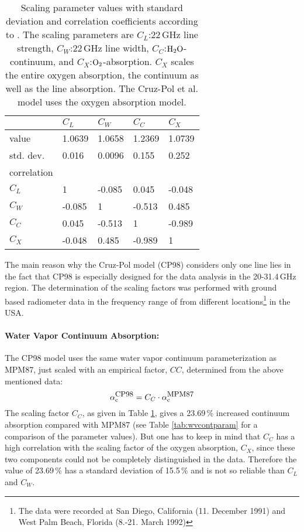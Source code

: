 \begin{table}[!htb]
\begin{center}
\begin{tabular}{lllll}
\hline
            & $C_L$ & $C_W$ & $C_C$ & $C_X$ \\
\hline
value       & 1.0639 & 1.0658 & 1.2369 & 1.0739\\
std. dev.   & 0.016  & 0.0096 & 0.155  & 0.252\\
\hline
correlation & &&&\\
$C_L$       & 1      & -0.085 & 0.045  & -0.048\\
$C_W$       & -0.085 & 1      & -0.513 &  0.485\\
$C_C$       & 0.045  & -0.513 & 1      & -0.989\\
$C_X$       & -0.048 & 0.485  & -0.989 & 1\\
\hline
\end{tabular}
\end{center}
\caption[CP98 scaling parameter values.]{Scaling parameter values with standard deviation and 
  correlation coefficients according to \citep{cruzpol:98}.
  The scaling parameters are $C_L$:22\,GHz line strength, 
  $C_W$:22\,GHz line width, $C_C$:$\mbox{H}_2\mbox{O}$-continuum, and 
  $C_X$:$\mbox{O}_2$-absorption. $C_X$ scales the entire oxygen absorption, 
  the continuum as well as the line absorption. The Cruz-Pol et al.
  model uses the \citet{pwr:93} oxygen absorption model.}
\label{tab:cp_orr}
\end{table}

The main reason why the Cruz-Pol model (CP98) considers only one line
lies in the fact that CP98 is especially designed for the data analysis
in the 20-31.4\,GHz region. The determination of the scaling factors was 
performed with ground based radiometer data in the frequency range of
from different locations\footnote{The data were recorded at San Diego, 
California (11. December 1991) and West Palm Beach, Florida 
(8.-21. March 1992)} in the USA.


\paragraph{Water Vapor Continuum Absorption:}
\label{levele:cp98_h2ocont}
The CP98 model uses the same water vapor continuum 
parameterization as MPM87, just scaled with an empirical 
factor, $CC$, determined from the above mentioned data:
\begin{equation}
 \label{eq:cp98_cont_scaling}
 \alpha^{\mbox{\rm \small CP98}}_{\rm c} = C_C \cdot \alpha^{\mbox{\rm \small MPM87}}_{\rm c} 
\end{equation}
The scaling factor $C_C$, as given in Table \ref{tab:cp_orr}, 
gives a 23.69\,\% increased continuum absorption compared 
with MPM87 (see Table \ref{tab:wvcontparam} for a comparison of the 
parameter values). But one has to keep in mind that $C_C$ has a 
high correlation with the scaling factor of the oxygen 
absorption, $C_X$, since these two components could not 
be completely distinguished in the data. Therefore the 
value of 23.69\,\% has a standard deviation of 15.5\,\% 
and is not so reliable than $C_L$ and $C_W$.





